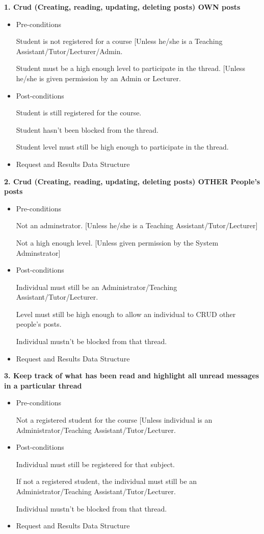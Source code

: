 \documentclass[a4paper,12pt]{report}
\begin{document}
\textbf {1. Crud (Creating, reading, updating, deleting posts) OWN posts}
\begin{itemize}
    \item{Pre-conditions}

	{ Student is not registered for a course [Unless he/she is a Teaching Assistant/Tutor/Lecturer/Admin.}

	{Student must be a high enough level to participate in the thread. [Unless he/she is given permission by an Admin or Lecturer.}
 
    \item{Post-conditions }

	{Student is still registered for the course.}

	{Student hasn't been blocked from the thread.}

	{Student level must still be high enough to participate in the thread.} 

    \item{Request and Results Data Structure} 

\end{itemize}
\textbf {2. Crud (Creating, reading, updating, deleting posts) OTHER People's posts}
\begin{itemize}
    \item{Pre-conditions}

	{Not an adminstrator. [Unless he/she is a Teaching Assistant/Tutor/Lecturer]}

	{Not a high enough level. [Unless given permission by the System Adminstrator]}
 
    \item{Post-conditions }

	{Individual must still be an Administrator/Teaching Assistant/Tutor/Lecturer.}

	{Level must still be high enough to allow an individual to CRUD other people's posts.}

	{Individual mustn't be blocked from that thread.}


    \item{Request and Results Data Structure} 

\end{itemize}
\textbf {3. Keep track of what has been read and highlight all unread messages in a particular thread}
\begin{itemize}
    \item{Pre-conditions}

	{Not a registered student for the course [Unless individual is an Administrator/Teaching Assistant/Tutor/Lecturer.}

    \item{Post-conditions }

	{Individual must still be registered for that subject.}

	{If not a registered student, the individual must still be an Administrator/Teaching Assistant/Tutor/Lecturer.}

	{Individual mustn't be blocked from that thread.}


    \item{Request and Results Data Structure} 

\end{itemize}
\end{document}

